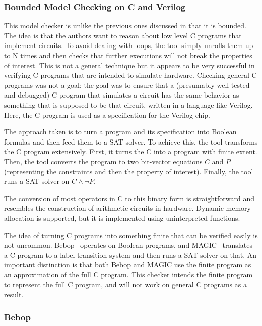 \documentclass{article}
\begin{document}
\begin{multicols}{2}
\subsubsection{Bounded Model Checking on C and Verilog~\cite{775928}}

This model checker is unlike the previous ones discussed in that it is
bounded.  The idea is that the authors want to reason about low level
C programs that implement circuits.  To avoid dealing with loops, the
tool simply unrolls them up to N times and then checks that further
executions will not break the properties of interest.  This is not a
general technique but it appears to be very successful in verifying C
programs that are intended to simulate hardware.  Checking general C
programs was not a goal; the goal was to ensure that a (presumably
well tested and debugged) C program that simulates a circuit has the
same behavior as something that is supposed to be that circuit,
written in a language like Verilog.  Here, the C program is used as a
specification for the Verilog chip.

The approach taken is to turn a program and its specification into
Boolean formulas and then feed them to a SAT solver.  To achieve this,
the tool transforms the C program extensively.  First, it turns the C
into a program with finite extent.  Then, the tool converts the program
to two bit-vector equations $C$ and $P$ (representing the constraints
and then the property of interest).  Finally, the tool runs a SAT
solver on $C \wedge \neg P$.

The conversion of most operators in C to this binary form is
straightforward and resembles the construction of arithmetic circuits
in hardware.  Dynamic memory allocation is supported, but it is
implemented using uninterpreted functions.

The idea of turning C programs into something finite that can be
verified easily is not uncommon.  Bebop~\cite{ball00bebop} operates on
Boolean programs, and MAGIC~\cite{776863} translates a C program to a
label transition system and then runs a SAT solver on that.  An
important distinction is that both Bebop and MAGIC use the finite
program as an approximation of the full C program.  This checker
intends the finite program to represent the full C program, and will
not work on general C programs as a result.

\subsubsection{Bebop~\cite{ball00bebop}}


\end{multicols}
\end{document}
